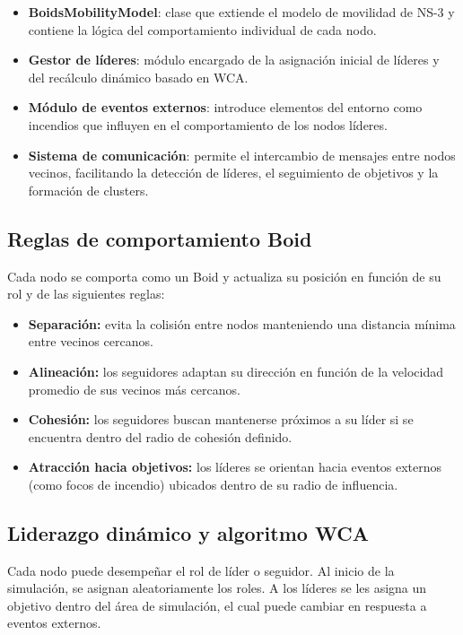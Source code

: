 \documentclass{article}
\begin{document}
\begin{itemize}
    \item \textbf{BoidsMobilityModel}: clase que extiende el modelo de movilidad de NS-3 y contiene la lógica del comportamiento individual de cada nodo.
    \item \textbf{Gestor de líderes}: módulo encargado de la asignación inicial de líderes y del recálculo dinámico basado en WCA.
    \item \textbf{Módulo de eventos externos}: introduce elementos del entorno como incendios que influyen en el comportamiento de los nodos líderes.
    \item \textbf{Sistema de comunicación}: permite el intercambio de mensajes entre nodos vecinos, facilitando la detección de líderes, el seguimiento de objetivos y la formación de clusters.
\end{itemize}

\subsection{Reglas de comportamiento Boid}

Cada nodo se comporta como un Boid y actualiza su posición en función de su rol y de las siguientes reglas:

\begin{itemize}
    \item \textbf{Separación:} evita la colisión entre nodos manteniendo una distancia mínima entre vecinos cercanos.
    
    \item \textbf{Alineación:} los seguidores adaptan su dirección en función de la velocidad promedio de sus vecinos más cercanos.
    
    \item \textbf{Cohesión:} los seguidores buscan mantenerse próximos a su líder si se encuentra dentro del radio de cohesión definido.
    
    \item \textbf{Atracción hacia objetivos:} los líderes se orientan hacia eventos externos (como focos de incendio) ubicados dentro de su radio de influencia.
\end{itemize}

\subsection{Liderazgo dinámico y algoritmo WCA}

Cada nodo puede desempeñar el rol de líder o seguidor. Al inicio de la simulación, se asignan aleatoriamente los roles. A los líderes se les asigna un objetivo dentro del área de simulación, el cual puede cambiar en respuesta a eventos externos.
\end{document}
